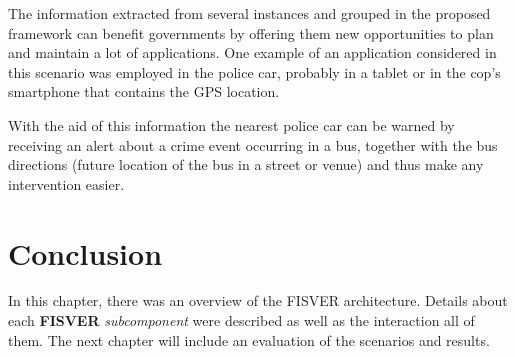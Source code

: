 The information extracted from several instances and grouped in the proposed framework can benefit governments by offering them new opportunities to plan and maintain a lot of applications. One example of an application considered in this scenario was employed in the police car, probably in a tablet or in the cop's smartphone that contains the GPS location. 

With the aid of this information the nearest police car can be warned by receiving an alert about a crime event occurring in a bus, together with the bus directions (future location of the bus in a street or venue) and thus make any intervention easier.
%
%
\section{Conclusion}
%
%
In this chapter, there was an overview of the FISVER architecture. Details about each \textbf{FISVER} \textit{subcomponent} were described as well as the interaction all of them. The next chapter will include an evaluation of the scenarios and results.
